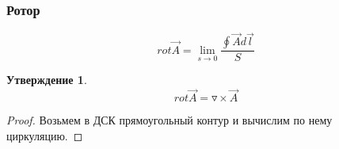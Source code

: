\documentclass{article}
\newtheorem{ass}{Утверждение}
\begin{document}
    \subsubsection*{Ротор}
    $$ rot \overrightarrow{A} = \lim\limits_{s \rightarrow 0} \frac{\oint \overrightarrow{A}d\overrightarrow{l}}{S} $$
    
    \begin{ass}
    $$ rot \overrightarrow{A} = \triangledown \times \overrightarrow{A} $$
    \end{ass}
    \begin{proof}
    Возьмем в ДСК прямоугольный контур и вычислим по нему циркуляцию. 
    \end{proof}
\end{document}

